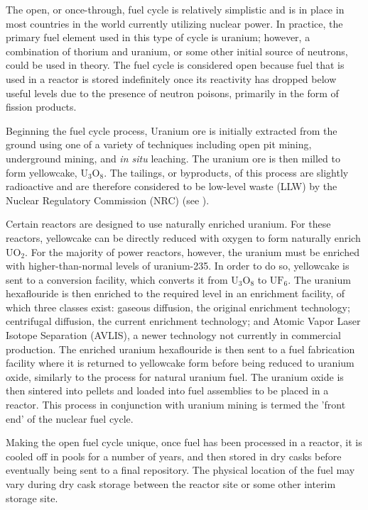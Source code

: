 The open, or once-through, fuel cycle is relatively simplistic and is in place
in most countries in the world currently utilizing nuclear power. In practice,
the primary fuel element used in this type of cycle is uranium; however, a
combination of thorium and uranium, or some other initial source of neutrons,
could be used in theory. The fuel cycle is considered open because fuel that is
used in a reactor is stored indefinitely once its reactivity has dropped below
useful levels due to the presence of neutron poisons, primarily in the form of
fission products.

Beginning the fuel cycle process, Uranium ore is initially extracted from the
ground using one of a variety of techniques including open pit mining,
underground mining, and \textit{in situ} leaching. The uranium ore is then
milled to form yellowcake, $\mathrm{U_3O_8}$. The tailings, or byproducts, of
this process are slightly radioactive and are therefore considered to be
low-level waste (LLW) by the Nuclear Regulatory Commission (NRC)
(see \citet{nrc_10_1985}).

Certain reactors are designed to use naturally enriched uranium. For these
reactors, yellowcake can be directly reduced with oxygen to form naturally
enrich $\mathrm{UO_2}$. For the majority of power reactors, however, the uranium
must be enriched with higher-than-normal levels of uranium-235. In order to do
so, yellowcake is sent to a conversion facility, which converts it from
$\mathrm{U_3O_8}$ to $\mathrm{UF_6}$. The uranium hexaflouride is then enriched
to the required level in an enrichment facility, of which three classes exist:
gaseous diffusion, the original enrichment technology; centrifugal diffusion,
the current enrichment technology; and Atomic Vapor Laser Isotope Separation
(AVLIS), a newer technology not currently in commercial production. The enriched
uranium hexaflouride is then sent to a fuel fabrication facility where it is
returned to yellowcake form before being reduced to uranium oxide, similarly to
the process for natural uranium fuel. The uranium oxide is then sintered into
pellets and loaded into fuel assemblies to be placed in a reactor. This process
in conjunction with uranium mining is termed the 'front end' of the nuclear fuel
cycle.

Making the open fuel cycle unique, once fuel has been processed in a reactor, it
is cooled off in pools for a number of years, and then stored in dry casks
before eventually being sent to a final repository. The physical location of the
fuel may vary during dry cask storage between the reactor site or some other
interim storage site.

